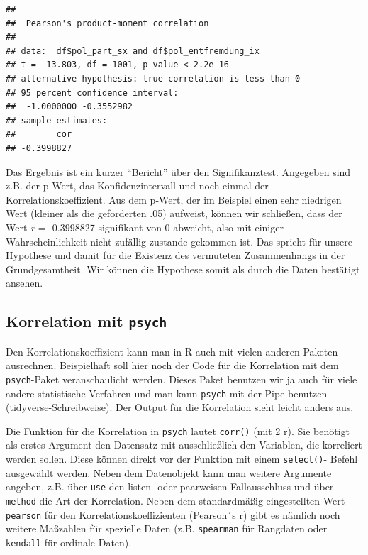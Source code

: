\documentclass[
]{book}
\newenvironment{Shaded}{\begin{snugshade}}{\end{snugshade}}
\newcommand{\AttributeTok}[1]{\textcolor[rgb]{0.77,0.63,0.00}{#1}}
\newcommand{\FunctionTok}[1]{\textcolor[rgb]{0.00,0.00,0.00}{#1}}
\newcommand{\NormalTok}[1]{#1}
\newcommand{\SpecialCharTok}[1]{\textcolor[rgb]{0.00,0.00,0.00}{#1}}
\newcommand{\StringTok}[1]{\textcolor[rgb]{0.31,0.60,0.02}{#1}}
\begin{document}
\begin{Shaded}
\end{Shaded}

\begin{verbatim}
## 
##  Pearson's product-moment correlation
## 
## data:  df$pol_part_sx and df$pol_entfremdung_ix
## t = -13.803, df = 1001, p-value < 2.2e-16
## alternative hypothesis: true correlation is less than 0
## 95 percent confidence interval:
##  -1.0000000 -0.3552982
## sample estimates:
##        cor 
## -0.3998827
\end{verbatim}

Das Ergebnis ist ein kurzer ``Bericht'' über den Signifikanztest. Angegeben sind z.B. der p-Wert, das Konfidenzintervall und noch einmal der Korrelationskoeffizient. Aus dem p-Wert, der im Beispiel einen sehr niedrigen Wert (kleiner als die geforderten .05) aufweist, können wir schließen, dass der Wert \emph{r} = -0.3998827 signifikant von 0 abweicht, also mit einiger Wahrscheinlichkeit nicht zufällig zustande gekommen ist. Das spricht für unsere Hypothese und damit für die Existenz des vermuteten Zusammenhangs in der Grundgesamtheit. Wir können die Hypothese somit als durch die Daten bestätigt ansehen.

\hypertarget{korrelation-mit-psych}{%
\subsection{\texorpdfstring{Korrelation mit \texttt{psych}}{Korrelation mit psych}}\label{korrelation-mit-psych}}

Den Korrelationskoeffizient kann man in R auch mit vielen anderen Paketen ausrechnen. Beispielhaft soll hier noch der Code für die Korrelation mit dem \texttt{psych}-Paket veranschaulicht werden. Dieses Paket benutzen wir ja auch für viele andere statistische Verfahren und man kann \texttt{psych} mit der Pipe benutzen (tidyverse-Schreibweise). Der Output für die Korrelation sieht leicht anders aus.

Die Funktion für die Korrelation in \texttt{psych} lautet \texttt{corr()} (mit 2 r). Sie benötigt als erstes Argument den Datensatz mit ausschließlich den Variablen, die korreliert werden sollen. Diese können direkt vor der Funktion mit einem \texttt{select()}- Befehl ausgewählt werden. Neben dem Datenobjekt kann man weitere Argumente angeben, z.B. über \texttt{use} den listen- oder paarweisen Fallausschluss und über \texttt{method} die Art der Korrelation. Neben dem standardmäßig eingestellten Wert \texttt{pearson} für den Korrelationskoeffizienten (Pearson´s r) gibt es nämlich noch weitere Maßzahlen für spezielle Daten (z.B. \texttt{spearman} für Rangdaten oder \texttt{kendall} für ordinale Daten).
\end{document}
